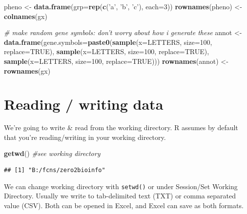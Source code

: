 \documentclass[]{article}
\newenvironment{Shaded}{\begin{snugshade}}{\end{snugshade}}
\newcommand{\KeywordTok}[1]{\textcolor[rgb]{0.13,0.29,0.53}{\textbf{#1}}}
\newcommand{\DataTypeTok}[1]{\textcolor[rgb]{0.13,0.29,0.53}{#1}}
\newcommand{\DecValTok}[1]{\textcolor[rgb]{0.00,0.00,0.81}{#1}}
\newcommand{\StringTok}[1]{\textcolor[rgb]{0.31,0.60,0.02}{#1}}
\newcommand{\CommentTok}[1]{\textcolor[rgb]{0.56,0.35,0.01}{\textit{#1}}}
\newcommand{\OtherTok}[1]{\textcolor[rgb]{0.56,0.35,0.01}{#1}}
\newcommand{\NormalTok}[1]{#1}
\begin{document}
\begin{Shaded}
\begin{Highlighting}[]
\NormalTok{pheno <-}\StringTok{ }\KeywordTok{data.frame}\NormalTok{(}\DataTypeTok{grp=}\KeywordTok{rep}\NormalTok{(}\KeywordTok{c}\NormalTok{(}\StringTok{'a'}\NormalTok{, }\StringTok{'b'}\NormalTok{, }\StringTok{'c'}\NormalTok{), }\DataTypeTok{each=}\DecValTok{3}\NormalTok{))}
\KeywordTok{rownames}\NormalTok{(pheno) <-}\StringTok{ }\KeywordTok{colnames}\NormalTok{(gx)}

\CommentTok{# make random gene symbols: don't worry about how i generate these}
\NormalTok{annot <-}\StringTok{ }\KeywordTok{data.frame}\NormalTok{(}\DataTypeTok{gene.symbols=}\KeywordTok{paste0}\NormalTok{(}\KeywordTok{sample}\NormalTok{(}\DataTypeTok{x=}\NormalTok{LETTERS, }\DataTypeTok{size=}\DecValTok{100}\NormalTok{, }\DataTypeTok{replace=}\OtherTok{TRUE}\NormalTok{), }
                                        \KeywordTok{sample}\NormalTok{(}\DataTypeTok{x=}\NormalTok{LETTERS, }\DataTypeTok{size=}\DecValTok{100}\NormalTok{, }\DataTypeTok{replace=}\OtherTok{TRUE}\NormalTok{), }
                                        \KeywordTok{sample}\NormalTok{(}\DataTypeTok{x=}\NormalTok{LETTERS, }\DataTypeTok{size=}\DecValTok{100}\NormalTok{, }\DataTypeTok{replace=}\OtherTok{TRUE}\NormalTok{)))}
\KeywordTok{rownames}\NormalTok{(annot) <-}\StringTok{ }\KeywordTok{rownames}\NormalTok{(gx)}
\end{Highlighting}
\end{Shaded}

\section{Reading / writing data}\label{reading-writing-data}

We're going to write \& read from the working directory. R assumes by
default that you're reading/writing in your working directory.

\begin{Shaded}
\begin{Highlighting}[]
\KeywordTok{getwd}\NormalTok{() }\CommentTok{#see working directory}
\end{Highlighting}
\end{Shaded}

\begin{verbatim}
## [1] "B:/fcns/zero2bioinfo"
\end{verbatim}

We can change working directory with \texttt{setwd()} or under
Session/Set Working Directory. Usually we write to tab-delimited text
(TXT) or comma separated value (CSV). Both can be opened in Excel, and
Excel can save as both formats.
\end{document}
